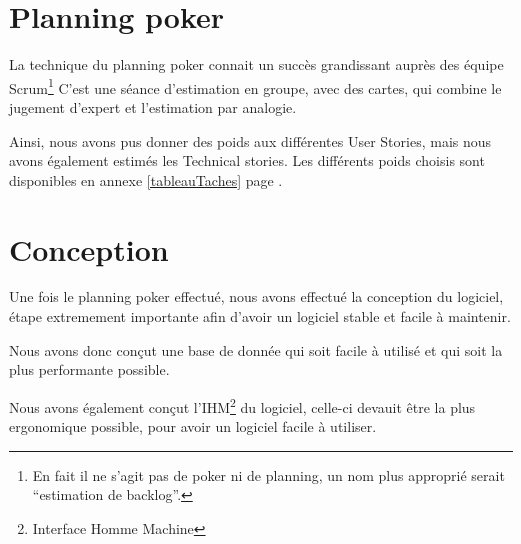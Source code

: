 \section{Planning poker}
	La technique du planning poker connait un succès grandissant auprès des équipe Scrum\footnote{En fait il ne s'agit pas de poker ni de planning, un nom plus approprié
	serait ``estimation de backlog''.}
	C'est une séance d'estimation en groupe, avec des cartes, qui combine le jugement d'expert et l'estimation par analogie.

	Ainsi, nous avons pus donner des poids aux différentes User Stories, mais nous avons également estimés les Technical stories.
	Les différents poids choisis sont disponibles en annexe \ref{tableauTaches} page \pageref{tableauTaches}.
\section{Conception}
	Une fois le planning poker effectué, nous avons effectué la conception du logiciel, étape extremement importante afin d'avoir un logiciel stable et facile à maintenir.

	Nous avons donc conçut une base de donnée qui soit facile à utilisé et qui soit la plus performante possible. 

	Nous avons également conçut l'IHM\footnote{Interface Homme Machine} du logiciel, celle-ci devauit être la plus ergonomique possible, pour avoir un logiciel facile à utiliser.
